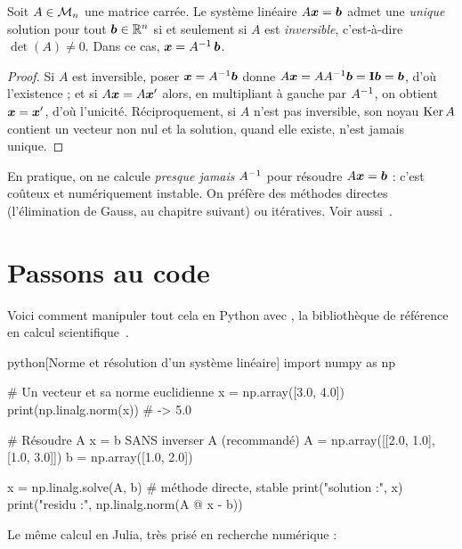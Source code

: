 \begin{theoreme}
Soit $A \in \mathcal{M}_{n}$ une matrice carrée. Le système linéaire $A\bm{x} =
\bm{b}$ admet une \emph{unique} solution pour tout $\bm{b}\in\mathbb{R}^{n}$ si et
seulement si $A$ est \emph{inversible}, c'est-à-dire $\det(A) \neq 0$.
Dans ce cas, $\bm{x} = {A}^{-1}\,\bm{b}$.
\end{theoreme}

\begin{proof}
Si $A$ est inversible, poser $\bm{x} = {A}^{-1}\bm{b}$ donne
$A\bm{x} = A{A}^{-1}\bm{b} = \mathbf{I}\bm{b} = \bm{b}$, d'où
l'existence ; et si $A\bm{x} = A\bm{x}'$ alors, en multipliant à gauche
par ${A}^{-1}$, on obtient $\bm{x} = \bm{x}'$, d'où l'unicité.
Réciproquement, si $A$ n'est pas inversible, son noyau $\operatorname{Ker} A$ contient un
vecteur non nul et la solution, quand elle existe, n'est jamais unique.
\end{proof}

\begin{remarque}
En pratique, on ne calcule \emph{presque jamais} ${A}^{-1}$ pour résoudre
$A\bm{x}=\bm{b}$ : c'est coûteux et numériquement instable. On préfère
des méthodes directes (l'élimination de Gauss, au chapitre suivant) ou
itératives. Voir aussi~\textcite{golubvanloan2013}.
\end{remarque}

\section{Passons au code}

Voici comment manipuler tout cela en Python avec , la
bibliothèque de référence en calcul scientifique~\parencite{harris2020numpy}.

\begin{code}{python}[Norme et résolution d'un système linéaire]
import numpy as np

# Un vecteur et sa norme euclidienne
x = np.array([3.0, 4.0])
print(np.linalg.norm(x))          # -> 5.0

# Résoudre A x = b SANS inverser A (recommandé)
A = np.array([[2.0, 1.0],
              [1.0, 3.0]])
b = np.array([1.0, 2.0])

x = np.linalg.solve(A, b)         # méthode directe, stable
print("solution :", x)
print("residu   :", np.linalg.norm(A @ x - b))
\end{code}

Le même calcul en Julia, très prisé en recherche numérique :

